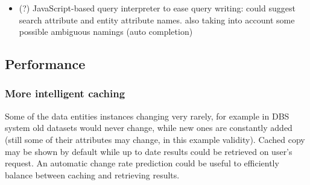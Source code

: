 \begin{itemize}
\begin{itemize}
\item making use of direct access to database {\color{red}(if available; in theory)}
\begin{itemize}
\item one could do incremental indexing of a target database  \footnote{E.g. an inverted index of values in Oracle/MySQL DB tables can be built to keep the list of possible terms. For instance, Sphinx full text search engine can access DBs directly and also supports incremental indexing but it needs a bit of manual configuration {http://sphinxsearch.com/docs/current.html\#delta-updates} }, then try to map database table columns into API parameters (manually or even automatically by applying some of Data Integration approaches)
\item then this index + mapping could be used to improve the keyword search (better mapping from keywords to API inputs) or even structured search (e.g. query cleaning/term auto-completion)
\item problem: the owners of services may not want to provide direct access to DB because of no trust, security or performance issues
\item may need to exclude very large tables
\end{itemize}
	\end{itemize}
\item (?) JavaScript-based query interpreter to ease query writing: could suggest search attribute and entity attribute names. also taking into account some possible ambiguous namings (auto completion)
	
	
\end{itemize}


\subsection{Performance}



\subsubsection*{More intelligent caching}
Some of the data entities instances changing very rarely, for example in DBS system old datasets would never change, while new ones are constantly added (still some of their attributes may change, in this example validity). 
%
Cached copy may be shown by default while up to date results could be retrieved on user's request. An automatic change rate prediction could be useful to efficiently balance between caching and retrieving results.

